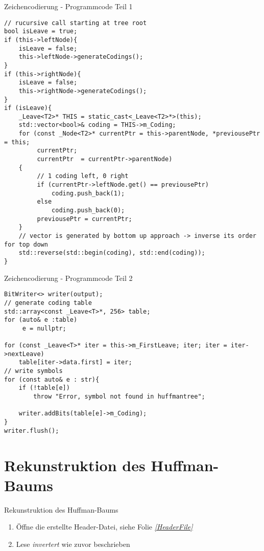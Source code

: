 \documentclass{beamer}
\begin{document}
  \begin{frame}[fragile]{Zeichencodierung - \newline Programmcode Teil 1}
  	\begin{lstlisting}[style=numbers]
// rucursive call starting at tree root
bool isLeave = true;
if (this->leftNode){
    isLeave = false;
    this->leftNode->generateCodings();
}
if (this->rightNode){
    isLeave = false;
    this->rightNode->generateCodings();
}
if (isLeave){
    _Leave<T2>* THIS = static_cast<_Leave<T2>*>(this);
    std::vector<bool>& coding = THIS->m_Coding;
    for (const _Node<T2>* currentPtr = this->parentNode, *previousePtr = this;
         currentPtr;
         currentPtr  = currentPtr->parentNode)
    {
         // 1 coding left, 0 right
         if (currentPtr->leftNode.get() == previousePtr)
             coding.push_back(1);
         else
             coding.push_back(0);
         previousePtr = currentPtr;
    }
    // vector is generated by bottom up approach -> inverse its order for top down
    std::reverse(std::begin(coding), std::end(coding));
}
\end{lstlisting}
\end{frame} 
  
  \begin{frame}[fragile]{Zeichencodierung - \newline Programmcode Teil 2}
  	\begin{lstlisting}[style=numbers]
BitWriter<> writer(output);
// generate coding table
std::array<const _Leave<T>*, 256> table;
for (auto& e :table)
     e = nullptr;

for (const _Leave<T>* iter = this->m_FirstLeave; iter; iter = iter->nextLeave)
    table[iter->data.first] = iter;
// write symbols
for (const auto& e : str){
    if (!table[e])
        throw "Error, symbol not found in huffmantree";

    writer.addBits(table[e]->m_Coding);
}
writer.flush();
\end{lstlisting}
\end{frame} 
  
  \section{Rekunstruktion des Huffman-Baums}
  \begin{frame}{Rekunstruktion des Huffman-Baums}
  	\begin{enumerate}
  		\item Öffne die erstellte Header-Datei, siehe Folie \textit{\ref{HeaderFile}}
  		\item Lese \textit{invertert} wie zuvor beschrieben
  	\end{enumerate}
  \end{frame}
  
\end{document}
